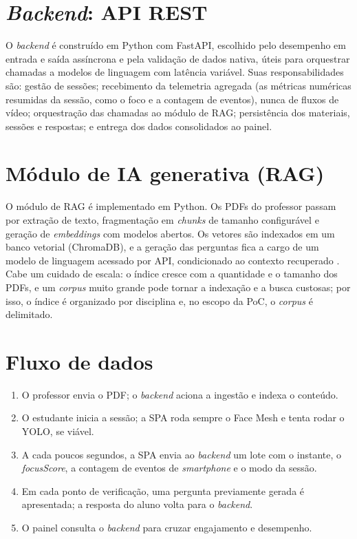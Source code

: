 \documentclass[portuguese,oneside]{tcc}
\begin{document}
\section{\emph{Backend}: API REST}

O \emph{backend} é construído em Python com FastAPI, escolhido pelo desempenho em entrada e saída assíncrona e pela validação de dados nativa, úteis para orquestrar chamadas a modelos de linguagem com latência variável. Suas responsabilidades são: gestão de sessões; recebimento da telemetria agregada (as métricas numéricas resumidas da sessão, como o foco e a contagem de eventos), nunca de fluxos de vídeo; orquestração das chamadas ao módulo de RAG; persistência dos materiais, sessões e respostas; e entrega dos dados consolidados ao painel.

\section{Módulo de IA generativa (RAG)}

O módulo de RAG é implementado em Python. Os PDFs do professor passam por extração de texto, fragmentação em \emph{chunks} de tamanho configurável e geração de \emph{embeddings} com modelos abertos. Os vetores são indexados em um banco vetorial (ChromaDB), e a geração das perguntas fica a cargo de um modelo de linguagem acessado por API, condicionado ao contexto recuperado \cite{LPP20,GXG23}. Cabe um cuidado de escala: o índice cresce com a quantidade e o tamanho dos PDFs, e um \emph{corpus} muito grande pode tornar a indexação e a busca custosas; por isso, o índice é organizado por disciplina e, no escopo da PoC, o \emph{corpus} é delimitado.

\section{Fluxo de dados}

\begin{enumerate}
  \item O professor envia o PDF; o \emph{backend} aciona a ingestão e indexa o conteúdo.
  \item O estudante inicia a sessão; a SPA roda sempre o Face Mesh e tenta rodar o YOLO, se viável.
  \item A cada poucos segundos, a SPA envia ao \emph{backend} um lote com o instante, o \emph{focusScore}, a contagem de eventos de \emph{smartphone} e o modo da sessão.
  \item Em cada ponto de verificação, uma pergunta previamente gerada é apresentada; a resposta do aluno volta para o \emph{backend}.
  \item O painel consulta o \emph{backend} para cruzar engajamento e desempenho.
\end{enumerate}
\end{document}
